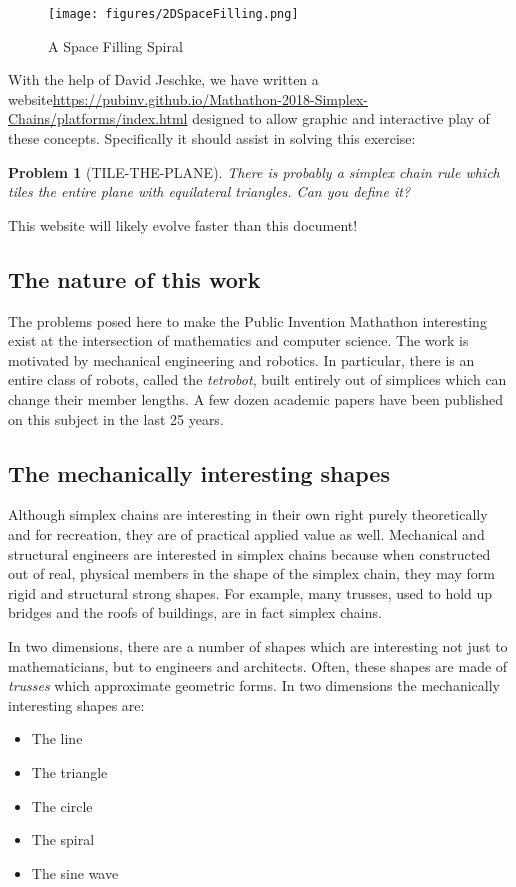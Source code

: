 \documentclass[11pt]{article}
\newtheorem{problem}{Problem}
\begin{document}
\begin{figure}
     \centering
     \texttt{[image: figures/2DSpaceFilling.png]}
     \caption{A Space Filling Spiral}
  \label{fig:equitetrabeam}
\end{figure}




With the help of David Jeschke, we have written a website\url{https://pubinv.github.io/Mathathon-2018-Simplex-Chains/platforms/index.html}
designed to allow graphic and interactive play of these concepts.  Specifically it should assist in solving this exercise:

\begin{problem}[TILE-THE-PLANE]
  There is probably a simplex chain rule which tiles the entire plane with equilateral triangles. Can you define it?
\end{problem}

This website will likely evolve faster than this document!

\subsection{The nature of this work}

The problems posed here to make the Public Invention Mathathon interesting exist at the intersection of mathematics and
computer science. The work is motivated by mechanical engineering and robotics. In particular, there is an entire class
of robots, called the {\em tetrobot}, built entirely out of simplices which can change their member lengths. A few
dozen academic papers have been published on this subject in the last 25 years\cite{read2018transforming,sanderson1996modular,lee2002dynamic,NTRT}.

\subsection{The mechanically interesting shapes}

Although simplex chains are interesting in their own right purely theoretically and for recreation,
they are of practical applied value as well.
Mechanical and structural engineers are interested in simplex chains because when constructed out of real, physical
members in the shape of the simplex chain, they may form rigid and structural strong shapes.
For example, many trusses, used to hold up bridges and the roofs of buildings, are in fact simplex chains.

In two dimensions, there are a number of shapes which are interesting not just to mathematicians, but
to engineers and architects. Often, these shapes are made of {\em trusses} which approximate
geometric forms.
In two dimensions the mechanically interesting shapes are:
\begin{itemize}
\item The line
\item The triangle
\item The circle
\item The spiral
\item The sine wave
\end{itemize}
\end{document}
